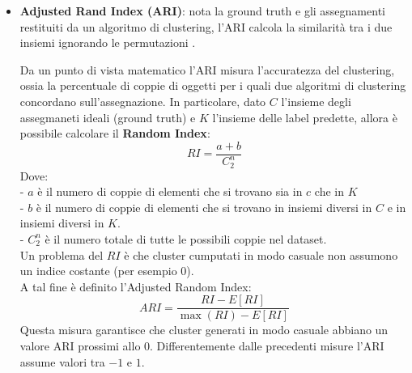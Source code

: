 \begin{itemize}
\item \textbf{Adjusted Rand Index (ARI)}: nota la ground truth e gli assegnamenti restituiti da un algoritmo di clustering, l'ARI calcola la similarità tra i due insiemi ignorando le permutazioni \cite{Santos09}. 

Da un punto di vista matematico l'ARI misura l'accuratezza del clustering, ossia la percentuale di coppie di oggetti per i quali due algoritmi di clustering concordano sull'assegnazione. 
In particolare, dato $C$ l'insieme degli assegmaneti ideali (ground truth) e $K$ l'insieme delle label predette, allora è possibile calcolare il \textbf{Random Index}:
\begin{equation}
RI = \frac{a + b}{C_2^n}
\end{equation}
Dove:
\\
- $a$ è il numero di coppie di elementi che si trovano sia in $c$ che in $K$
\\
- $b$ è il numero di coppie di elementi che si trovano in insiemi diversi in $C$ e in insiemi diversi in $K$.
\\
- $C_2^n$ è il numero totale di tutte le possibili coppie nel dataset. 
\\

Un problema del $RI$ è che cluster cumputati in modo casuale non assumono un indice costante (per esempio 0).
\\ A tal fine è definito l'Adjusted Random Index:
\begin{equation}
ARI = \frac{RI - E[RI]}{\max (RI) - E[RI]}
\end{equation}
Questa misura garantisce che cluster generati in modo casuale abbiano un valore ARI prossimi allo 0.
Differentemente dalle precedenti misure l'ARI assume valori tra $-1$ e $1$. %


\end{itemize}
